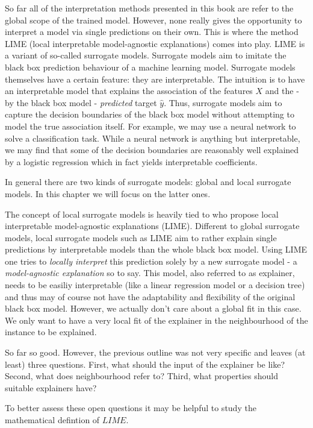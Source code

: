 \documentclass[]{krantz}
\begin{document}
So far all of the interpretation methods presented in this book are
refer to the global scope of the trained model. However, none really
gives the opportunity to interpret a model via single predictions on
their own. This is where the method LIME (local interpretable
model-agnostic explanations) comes into play. LIME is a variant of
so-called surrogate models. Surrogate models aim to imitate the black
box prediction behaviour of a machine learning model. Surrogate models
themselves have a certain feature: they are interpretable. The intuition
is to have an interpretable model that explains the association of the
features \(X\) and the - by the black box model - \emph{predicted}
target \(\hat{y}\). Thus, surrogate models aim to capture the decision
boundaries of the black box model without attempting to model the true
association itself. For example, we may use a neural network to solve a
classification task. While a neural network is anything but
interpretable, we may find that some of the decision boundaries are
reasonably well explained by a logistic regression which in fact yields
interpretable coefficients.

In general there are two kinds of surrogate models: global and local
surrogate models. In this chapter we will focus on the latter ones.

The concept of local surrogate models is heavily tied to \cite{LIME} who
propose local interpretable model-agnostic explanations (LIME).
Different to global surrogate models, local surrogate models such as
LIME aim to rather explain single predictions by interpretable models
than the whole black box model. Using LIME one tries to
\emph{locally interpret} this prediction solely by a new surrogate model
- a \emph{model-agnostic explanation} so to say. This model, also
referred to as explainer, needs to be easiliy interpretable (like a
linear regression model or a decision tree) and thus may of course not
have the adaptability and flexibility of the original black box model.
However, we actually don't care about a global fit in this case. We only
want to have a very local fit of the explainer in the neighbourhood of
the instance to be explained.

So far so good. However, the previous outline was not very specific and
leaves (at least) three questions. First, what should the input of the
explainer be like? Second, what does neighbourhood refer to? Third, what
properties should suitable explainers have?

To better assess these open questions it may be helpful to study the
mathematical defintion of \(LIME\).
\end{document}
